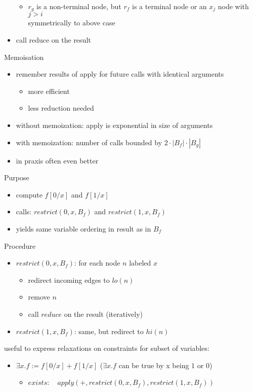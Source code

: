 \documentclass[a4paper, 10pt]{article}
\begin{document}
\begin{mdframed}
\begin{itemize}
\begin{itemize}
        \item $r_g$ is a non-terminal node, but $r_f$ is a terminal node or an $x_j$ node with $j>i$
        \\ \follows symmetrically to above case
    \end{itemize}
    \item call reduce on the result
\end{itemize}
Memoisation
\begin{itemize}
    \item remember results of apply for future calls with identical arguments
    \begin{itemize}
        \item more efficient
        \item less reduction needed
    \end{itemize}
    \item without memoization: apply is exponential in size of arguments
    \item with memoization: number of calls bounded by $2\cdot|B_f|\cdot|B_g|$
    \item in praxis often even better
\end{itemize}
Purpose
\begin{itemize}
    \item compute $f[0/x]$ and $f[1/x]$
    \item calls: $restrict(0,x,B_f)$ and $restrict(1,x,B_f)$
    \item[\follows] yields same variable ordering in result as in $B_f$
\end{itemize}
Procedure
\begin{itemize}
    \item $restrict(0,x,B_f)$: for each node $n$ labeled $x$
    \begin{itemize}
        \item redirect incoming edges to $lo(n)$
        \item remove $n$
        \item call $reduce$ on the result (iteratively)
    \end{itemize}
    \item $restrict(1,x,B_f)$: same, but redirect to $hi(n)$
\end{itemize}
useful to express relaxations on constraints for subset of variables:
\begin{itemize}
    \item $\exists x.f := f[0/x]+f[1/x]$ {\tiny ($\exists x.f$ can be true by x being $1$ or $0$)}
    \begin{itemize}
        \item $exists:\quad apply(+,restrict(0,x,B_f),restrict(1,x,B_f))$
    \end{itemize}
\end{itemize}
\end{mdframed}



\end{document}
